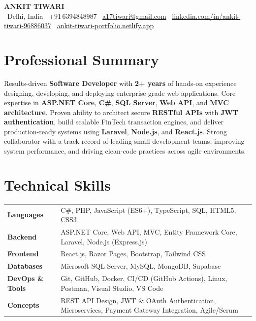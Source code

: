 \documentclass[11pt, a4paper]{article}
\begin{document}
\begin{center}
  {\LARGE \textbf{ANKIT TIWARI}} \\[5pt]
  \small
  \faMapMarker*\ Delhi, India \enspace\textbar\enspace
  \faPhone\ +91\,6394848987 \enspace\textbar\enspace
  \faEnvelope\ \href{mailto:a17tiwari@gmail.com}{a17tiwari@gmail.com} \enspace\textbar\enspace
  \faLinkedin\ \href{https://linkedin.com/in/ankit-tiwari-96886037}{linkedin.com/in/ankit-tiwari-96886037} \enspace\textbar\enspace
  \faGlobe\ \href{https://ankit-tiwari-portfolio.netlify.app/}{ankit-tiwari-portfolio.netlify.app}
\end{center}

\vspace{2pt}

\section*{Professional Summary}
Results-driven \textbf{Software Developer} with \textbf{2+ years} of hands-on experience designing, developing, and deploying enterprise-grade web applications. Core expertise in \textbf{ASP.NET Core}, \textbf{C\#}, \textbf{SQL Server}, \textbf{Web API}, and \textbf{MVC architecture}. Proven ability to architect secure \textbf{RESTful APIs} with \textbf{JWT authentication}, build scalable FinTech transaction engines, and deliver production-ready systems using \textbf{Laravel}, \textbf{Node.js}, and \textbf{React.js}. Strong collaborator with a track record of leading small development teams, improving system performance, and driving clean-code practices across agile environments.

\section*{Technical Skills}
\begin{tabularx}{\textwidth}{@{} l X @{}}
\textbf{Languages}       & C\#, PHP, JavaScript (ES6+), TypeScript, SQL, HTML5, CSS3 \\[2pt]
\textbf{Backend}         & ASP.NET Core, Web API, MVC, Entity Framework Core, Laravel, Node.js (Express.js) \\[2pt]
\textbf{Frontend}        & React.js, Razor Pages, Bootstrap, Tailwind CSS \\[2pt]
\textbf{Databases}       & Microsoft SQL Server, MySQL, MongoDB, Supabase \\[2pt]
\textbf{DevOps \& Tools} & Git, GitHub, Docker, CI/CD (GitHub Actions), Linux, Postman, Visual Studio, VS Code \\[2pt]
\textbf{Concepts}        & REST API Design, JWT \& OAuth Authentication, Microservices, Payment Gateway Integration, Agile/Scrum \\
\end{tabularx}
\end{document}
